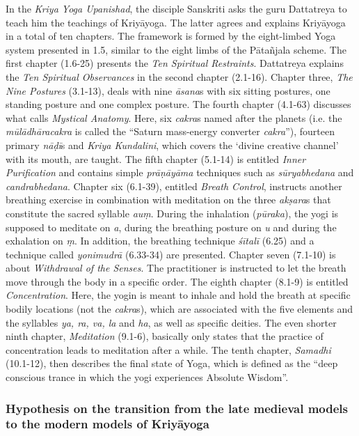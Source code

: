 In the \textit{Kriya Yoga Upanishad}, the disciple Sanskriti asks the guru Dattatreya to teach him the teachings of Kriyāyoga. The latter agrees and explains Kriyāyoga in a total of ten chapters. The framework is formed by the eight-limbed Yoga system presented in 1.5, similar to the eight limbs of the Pātañjala scheme. The first chapter (1.6-25) presents the \textit{Ten Spiritual Restraints}. Dattatreya explains the \textit{Ten Spiritual Observances} in the second chapter (2.1-16). Chapter three, \textit{The Nine Postures} (3.1-13), deals with nine \textit{āsana}s with six sitting postures, one standing posture and one complex posture. The fourth chapter (4.1-63) discusses what \citeauthor{kriyayogaupanishad1993} calls \textit{Mystical Anatomy}. Here, six \textit{cakra}s named after the planets (i.e. the \textit{mūlādhāracakra} is called the ``Saturn mass-energy converter \textit{cakra}''), fourteen primary \textit{nāḍī}s and \textit{Kriya Kundalini}, which covers the `divine creative channel' with its mouth, are taught. The fifth chapter (5.1-14) is entitled \textit{Inner Purification} and contains simple \textit{prāṇāyāma} techniques such as \textit{sūryabhedana} and \textit{candrabhedana}. Chapter six (6.1-39), entitled \textit{Breath Control}, instructs another breathing exercise in combination with meditation on the three \textit{akṣara}s that constitute the sacred syllable \textit{auṃ}. During the inhalation (\textit{pūraka}), the yogi is supposed to meditate on \textit{a}, during the breathing posture on \textit{u} and during the exhalation on \textit{ṃ}. In addition, the breathing technique \textit{śītalī} (6.25) and a technique called \textit{yonimudrā} (6.33-34) are presented. Chapter seven (7.1-10) is about \textit{Withdrawal of the Senses}. The practitioner is instructed to let the breath move through the body in a specific order. The eighth chapter (8.1-9) is entitled \textit{Concentration}. Here, the yogin is meant to inhale and hold the breath at specific bodily locations (not the \textit{cakra}s), which are associated with the five elements and the syllables \textit{ya, ra, va, la} and \textit {ha}, as well as specific deities. The even shorter ninth chapter, \textit{Meditation} (9.1-6), basically only states that the practice of concentration leads to meditation after a while. The tenth chapter, \textit{Samadhi} (10.1-12), then describes the final state of Yoga, which is defined as the ``deep conscious trance in which the yogi experiences Absolute Wisdom''.

\subsubsection{Hypothesis on the transition from the late medieval models to the modern models of Kriyāyoga}

